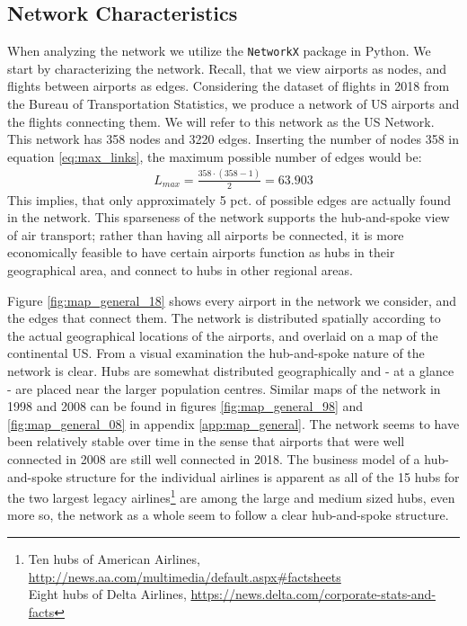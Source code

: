 \label{sec:empirical}
\subsection{Network Characteristics}
\label{subsec:empirical_network_characteristics}
When analyzing the network we utilize the \texttt{NetworkX} package in Python. We start by characterizing the network. Recall, that we view airports as nodes, and flights between airports as edges. Considering the dataset of flights in 2018 from the Bureau of Transportation Statistics, we produce a network of US airports and the flights connecting them. We will refer to this network as the US Network. This network has 358 nodes and 3220 edges. Inserting the number of nodes 358 in equation \ref{eq:max_links}, the maximum possible number of edges would be: 
\begin{align}
    L_{max}  = \frac{358\cdot(358-1)}{2} = 63.903
\end{align}
This implies, that only approximately 5 pct. of possible edges are actually found in the network. 
This sparseness of the network supports the hub-and-spoke view of air transport; rather than having all airports be connected, it is more economically feasible to have certain airports function as hubs in their geographical area, and connect to hubs in other regional areas.
\par
Figure \ref{fig:map_general_18} shows every airport in the network we consider, and the edges that connect them. The network is distributed spatially according to the actual geographical locations of the airports, and overlaid on a map of the continental US. From a visual examination the hub-and-spoke nature of the network is clear. Hubs are somewhat distributed geographically and - at a glance - are placed near the larger population centres. Similar maps of the network in 1998 and 2008 can be found in figures \ref{fig:map_general_98} and \ref{fig:map_general_08} in appendix \ref{app:map_general}. The network seems to have been relatively stable over time in the sense that airports that were well connected in 2008 are still well connected in 2018. The business model of a hub-and-spoke structure for the individual airlines is apparent as all of the 15 hubs for the two largest legacy airlines\footnote{Ten hubs of American Airlines, \url{http://news.aa.com/multimedia/default.aspx#factsheets}\\
Eight hubs of Delta Airlines, \url{https://news.delta.com/corporate-stats-and-facts}} are among the large and medium sized hubs, even more so, the network as a whole seem to follow a clear hub-and-spoke structure.
